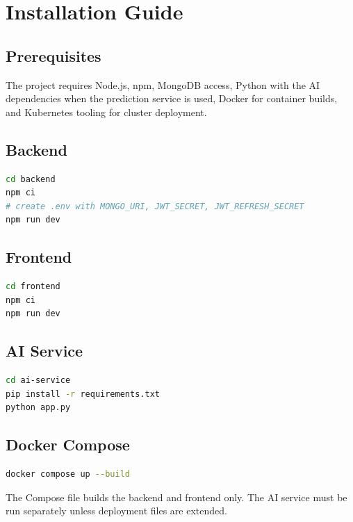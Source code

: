 \chapter{Installation Guide}
\section{Prerequisites}
The project requires Node.js, npm, MongoDB access, Python with the AI dependencies when the prediction service is used, Docker for container builds, and Kubernetes tooling for cluster deployment.

\section{Backend}
\begin{lstlisting}[language=bash]
cd backend
npm ci
# create .env with MONGO_URI, JWT_SECRET, JWT_REFRESH_SECRET
npm run dev
\end{lstlisting}

\section{Frontend}
\begin{lstlisting}[language=bash]
cd frontend
npm ci
npm run dev
\end{lstlisting}

\section{AI Service}
\begin{lstlisting}[language=bash]
cd ai-service
pip install -r requirements.txt
python app.py
\end{lstlisting}

\section{Docker Compose}
\begin{lstlisting}[language=bash]
docker compose up --build
\end{lstlisting}
The Compose file builds the backend and frontend only. The AI service must be run separately unless deployment files are extended.
